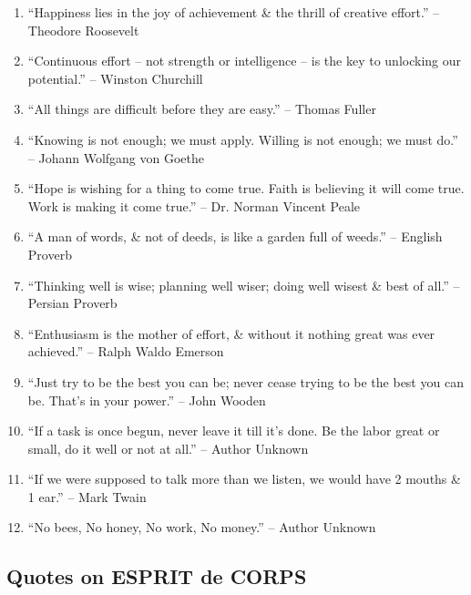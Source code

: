 \documentclass{article}
\begin{document}
\begin{enumerate}
	\item ``Happiness lies in the joy of achievement \& the thrill of creative effort.'' -- Theodore Roosevelt
	\item ``Continuous effort -- not strength or intelligence -- is the key to unlocking our potential.'' -- Winston Churchill
	\item ``All things are difficult before they are easy.'' -- Thomas Fuller
	\item ``Knowing is not enough; we must apply. Willing is not enough; we must do.'' -- Johann Wolfgang von Goethe
	\item ``Hope is wishing for a thing to come true. Faith is believing it will come true. Work is making it come true.'' -- Dr. Norman Vincent Peale
	\item ``A man of words, \& not of deeds, is like a garden full of weeds.'' -- English Proverb
	\item ``Thinking well is wise; planning well wiser; doing well wisest \& best of all.'' -- Persian Proverb
	\item ``Enthusiasm is the mother of effort, \& without it nothing great was ever achieved.'' -- Ralph Waldo Emerson
	\item ``Just try to be the best you can be; never cease trying to be the best you can be. That's in your power.'' -- John Wooden
	\item ``If a task is once begun, never leave it till it's done. Be the labor great or small, do it well or not at all.'' -- Author Unknown
	\item ``If we were supposed to talk more than we listen, we would have 2 mouths \& 1 ear.'' -- Mark Twain
	\item ``No bees, No honey, No work, No money.'' -- Author Unknown
\end{enumerate}

\subsection{Quotes on ESPRIT de CORPS}
\end{document}
